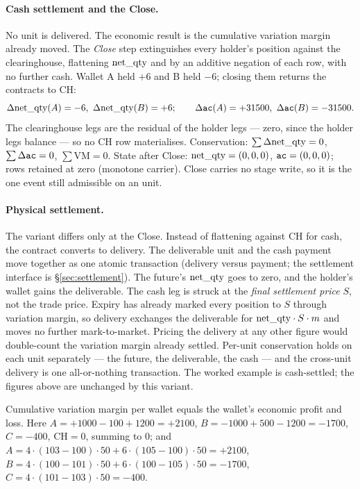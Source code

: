 \paragraph{Cash settlement and the Close.} No unit is delivered. The economic result is the
cumulative variation margin already moved. The \emph{Close} step extinguishes every holder's position
against the clearinghouse, flattening $\mathrm{net\_qty}$ and \ac{} by an additive negation of each row, with no
further cash. Wallet A held $+6$ and B held $-6$; closing them returns the contracts to CH:
\[
\Delta\mathrm{net\_qty}(A)=-6,\ \Delta\mathrm{net\_qty}(B)=+6;\qquad \Delta\texttt{ac}(A)=+31500,\ \Delta\texttt{ac}(B)=-31500.
\]
The clearinghouse legs are the residual of the holder legs --- zero, since the holder legs balance ---
so no CH row materialises. Conservation: $\sum\Delta\mathrm{net\_qty}=0$, $\sum\Delta\texttt{ac}=0$, $\sum\mathrm{VM}=0$.
State after Close: $\mathrm{net\_qty}=(0,0,0)$, $\texttt{ac}=(0,0,0)$; rows retained at zero (monotone carrier). Close
carries no stage write, so it is the one event still admissible on an  unit.

\paragraph{Physical settlement.} The variant differs only at the Close. Instead of flattening against
CH for cash, the contract converts to delivery. The deliverable unit and the cash payment move
together as one atomic transaction (delivery versus payment; the settlement interface is
\S\ref{sec:settlement}). The future's $\mathrm{net\_qty}$ goes to zero, and the holder's wallet gains the
deliverable. The cash leg is struck at the \emph{final settlement price} $S$, not the trade price.
Expiry has already marked every position to $S$ through variation margin, so delivery exchanges the
deliverable for $\mathrm{net\_qty}\cdot S\cdot m$ and moves no further mark-to-market. Pricing the delivery at
any other figure would double-count the variation margin already settled. Per-unit conservation holds
on each unit separately --- the future, the deliverable, the cash --- and the cross-unit delivery is
one all-or-nothing transaction. The worked example is cash-settled; the figures above are unchanged by
this variant.

\begin{theorem}
Cumulative variation margin per wallet equals the wallet's economic profit and loss. Here
$A=+1000-100+1200=+2100$, $B=-1000+500-1200=-1700$, $C=-400$, $\text{CH}=0$, summing to $0$; and
$A=4\cdot(103-100)\cdot 50+6\cdot(105-100)\cdot 50=+2100$,
$B=4\cdot(100-101)\cdot 50+6\cdot(100-105)\cdot 50=-1700$, $C=4\cdot(101-103)\cdot 50=-400$.
\end{theorem}

